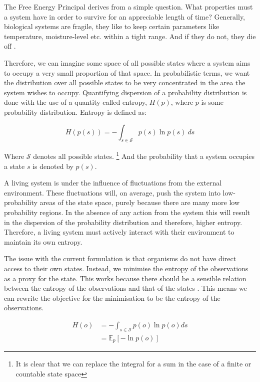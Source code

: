 \documentclass{article}
\begin{document}
The Free Energy Principal derives from a simple question. What properties must a system have in order to survive for an appreciable length of time? Generally, biological systems are fragile, they like to keep certain parameters like temperature, moisture-level etc. within a tight range. And if they do not, they die off \cite{millidge2019implementing}.

Therefore, we can imagine some space of all possible states where a system aims to occupy a very small proportion of that space. In probabilistic terms, we want the distribution over all possible states to be very concentrated in the area the system wishes to occupy. Quantifying dispersion of a probability distribution is done with the use of a quantity called entropy, $H(p)$, where $p$ is some probability distribution. Entropy is defined as:

\begin{equation}\label{entropy_states}
	H(p(s)) = - \int_{s \in \mathcal{S}} p(s) \ln p(s) \ ds
\end{equation}

Where $\mathcal{S}$ denotes all possible states. 
\footnote{It is clear that we can replace the integral for a sum in the case of a finite or countable state space} 
And the probability that a system occupies a state $s$ is denoted by $p(s)$. 

A living system is under the influence of fluctuations from the external environment. These fluctuations will, on average, push the system into low-probability areas of the state space, purely because there are many more low probability regions. In the absence of any action from the system this will result in the dispersion of the probability distribution and therefore, higher entropy. Therefore, a living system must actively interact with their environment to maintain its own entropy. 

The issue with the current formulation is that organisms do not have direct access to their own states. Instead, we minimise the entropy of the observations as a proxy for the state. This works because there should be a sensible relation between the entropy of the observations and that of the states \cite{millidge2019implementing}. This means we can rewrite the objective for the minimisation to be the entropy of the observations.

\begin{equation}\label{entropy_obs}
	\begin{aligned}
		H(o) &= - \int_{s \in \mathcal{S}} p(o) \ln p(o) ds \\
		&= \mathbb{E}_{p}\left[ - \ln p(o) \right]
	\end{aligned}
\end{equation}
\end{document}
